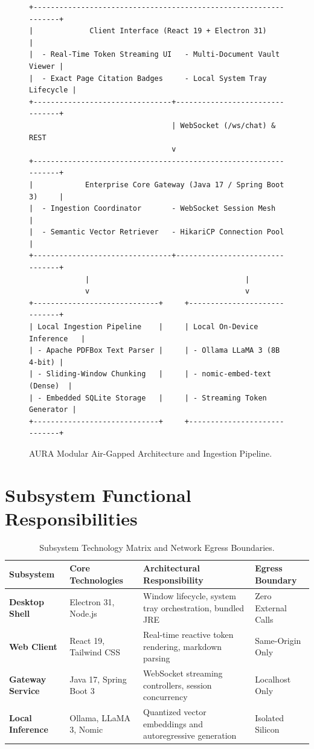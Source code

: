 \documentclass[12pt,a4paper]{report}
\begin{document}
\begin{figure}[htbp]
\centering
\footnotesize
\begin{verbatim}
+-----------------------------------------------------------------+
|             Client Interface (React 19 + Electron 31)           |
|  - Real-Time Token Streaming UI   - Multi-Document Vault Viewer |
|  - Exact Page Citation Badges     - Local System Tray Lifecycle |
+--------------------------------+--------------------------------+
                                 | WebSocket (/ws/chat) & REST
                                 v
+-----------------------------------------------------------------+
|            Enterprise Core Gateway (Java 17 / Spring Boot 3)     |
|  - Ingestion Coordinator       - WebSocket Session Mesh         |
|  - Semantic Vector Retriever   - HikariCP Connection Pool       |
+--------------------------------+--------------------------------+
             |                                    |
             v                                    v
+-----------------------------+     +-----------------------------+
| Local Ingestion Pipeline    |     | Local On-Device Inference   |
| - Apache PDFBox Text Parser |     | - Ollama LLaMA 3 (8B 4-bit) |
| - Sliding-Window Chunking   |     | - nomic-embed-text (Dense)  |
| - Embedded SQLite Storage   |     | - Streaming Token Generator |
+-----------------------------+     +-----------------------------+
\end{verbatim}
\caption{AURA Modular Air-Gapped Architecture and Ingestion Pipeline.}
\label{fig:aura_topology}
\end{figure}

\section{Subsystem Functional Responsibilities}

\begin{table}[htbp]
\centering
\small
\begin{tabularx}{\linewidth}{>{\raggedright\arraybackslash\bfseries}p{2.4cm}>{\raggedright\arraybackslash}X>{\raggedright\arraybackslash}X>{\raggedright\arraybackslash}p{2.2cm}}
\toprule
Subsystem & Core Technologies & Architectural Responsibility & Egress Boundary \\
\midrule
Desktop Shell & Electron 31, Node.js & Window lifecycle, system tray orchestration, bundled JRE & Zero External Calls \\
\addlinespace
Web Client & React 19, Tailwind CSS & Real-time reactive token rendering, markdown parsing & Same-Origin Only \\
\addlinespace
Gateway Service & Java 17, Spring Boot 3 & WebSocket streaming controllers, session concurrency & Localhost Only \\
\addlinespace
Local Inference & Ollama, LLaMA 3, Nomic & Quantized vector embeddings and autoregressive generation & Isolated Silicon \\
\bottomrule
\end{tabularx}
\caption{Subsystem Technology Matrix and Network Egress Boundaries.}
\label{tab:aura_subsystems}
\end{table}
\end{document}
